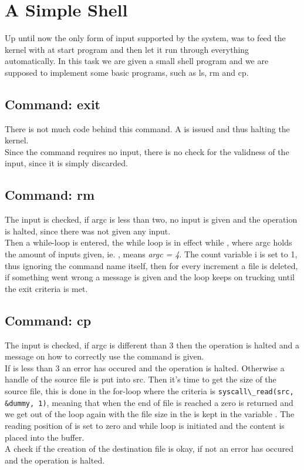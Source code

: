 %
%
%

\section{A Simple Shell}
Up until now the only form of input supported by the system, was to feed the
kernel with at start program and then let it run through everything
automatically. In this task we are given a small shell program and we are
supposed to implement some basic programs, such as ls, rm and cp.

\subsection{Command: exit}
There is not much code behind this command. A  is issued
and thus halting the kernel.\\
Since the command requires no input, there is no check for the validness of the
input, since it is simply discarded.

\subsection{Command: rm}
The input is checked, if argc is less than two, no input is given and the
operation is halted, since there was not given any input.\\
Then a while-loop is entered, the while loop is in effect while ,
where argc holds the amount of inputs given, ie. ,
means \textit{argc = 4}. The count variable i is set to 1, thus ignoring the
command name itself, then for every increment a file is deleted, if something
went wrong a message is given and the loop keeps on trucking until the exit
criteria is met. 

\subsection{Command: cp}
The input is checked, if argc is different than 3 then the operation is halted
and a message on how to correctly use the command is given.\\
If  is less than 3 an error has occured and the
operation is halted. Otherwise a handle of the source file is put into src. Then
it's time to get the size of the source file, this is done in the for-loop where
the criteria is \verb|syscall\_read(src, &dummy, 1)|, meaning that when the end
of file is reached a zero is returned and we get out of the loop again with the
file size in the is kept in the variable . The reading position of
 is set to zero and while loop is initiated and the content is placed
into the buffer.\\
A check if the creation of the destination file is okay, if not an error has
occured and the operation is halted.


